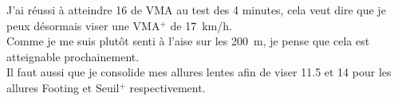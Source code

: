 \documentclass{article}
\begin{document}
    J'ai réussi à atteindre 16 de VMA au test des 4 minutes, cela veut dire que je peux désormais viser une VMA$^+$ de 17 km/h.\\
    Comme je me suis plutôt senti à l'aise sur les 200 m, je pense que cela est atteignable prochainement.\\
    Il faut aussi que je consolide mes allures lentes afin de viser 11.5 et 14 pour les allures Footing et Seuil$^+$ respectivement.
\end{document}
